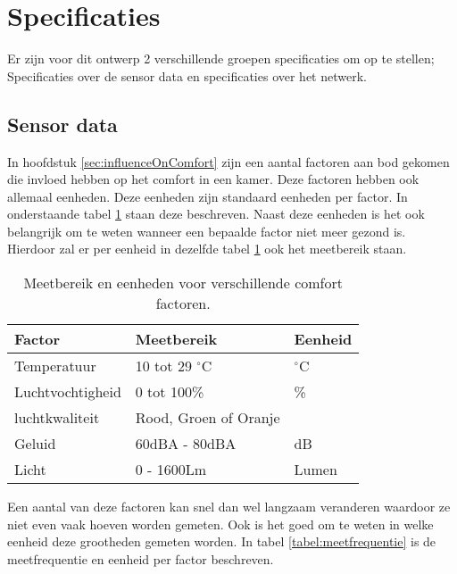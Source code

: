 \section{Specificaties}

Er zijn voor dit ontwerp 2 verschillende groepen specificaties om op te stellen; Specificaties over de sensor data en specificaties over het netwerk.

\subsection{Sensor data}
In hoofdstuk \ref{sec:influenceOnComfort} zijn een aantal factoren aan bod gekomen die invloed hebben op het comfort in een kamer.
Deze factoren hebben ook allemaal eenheden. Deze eenheden zijn standaard eenheden per factor. In onderstaande tabel \ref{tabel:meetbereik} staan deze beschreven.
Naast deze eenheden is het ook belangrijk om te weten wanneer een bepaalde factor niet meer gezond is. Hierdoor zal er per eenheid in dezelfde 
tabel \ref{tabel:meetbereik} ook het meetbereik staan.

\begin{table}[h]
    \centering
    \begin{tabular}{ |l|l|l| }\hline
        Factor           & Meetbereik            & Eenheid     \\\hline
        Temperatuur      & 10 tot 29 $^{\circ}$C & $^{\circ}$C \\\hline
        Luchtvochtigheid & 0 tot 100\%           & \%          \\\hline
        luchtkwaliteit   & Rood, Groen of Oranje &             \\\hline
        Geluid           & 60dBA - 80dBA         & dB          \\\hline
        Licht            & 0 - 1600Lm            & Lumen       \\\hline
    \end{tabular}
    \caption{Meetbereik en eenheden voor verschillende comfort factoren.}
    \label{tabel:meetbereik}
\end{table}

Een aantal van deze factoren kan snel dan wel langzaam veranderen waardoor ze niet even vaak hoeven worden gemeten. Ook is het goed
 om te weten in welke eenheid deze grootheden gemeten worden. In tabel \ref{tabel:meetfrequentie} is de meetfrequentie en eenheid per 
 factor beschreven.

